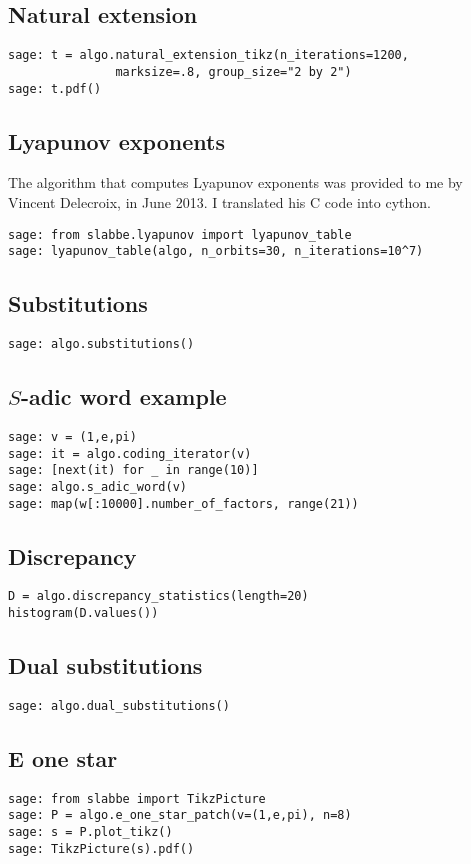 \subsection{Natural extension}
\begin{verbatim}
sage: t = algo.natural_extension_tikz(n_iterations=1200, 
               marksize=.8, group_size="2 by 2")
sage: t.pdf()
\end{verbatim}
\subsection{Lyapunov exponents}
The algorithm that computes Lyapunov exponents was provided to me
by Vincent Delecroix, in June 2013. I translated his C code into cython.
\begin{verbatim}
sage: from slabbe.lyapunov import lyapunov_table
sage: lyapunov_table(algo, n_orbits=30, n_iterations=10^7)
\end{verbatim}
\subsection{Substitutions}
\begin{verbatim}
sage: algo.substitutions()
\end{verbatim}
\subsection{$S$-adic word example}
\begin{verbatim}
sage: v = (1,e,pi)
sage: it = algo.coding_iterator(v)
sage: [next(it) for _ in range(10)]
sage: algo.s_adic_word(v)
sage: map(w[:10000].number_of_factors, range(21))  
\end{verbatim}
\subsection{Discrepancy}
\begin{verbatim}
D = algo.discrepancy_statistics(length=20)
histogram(D.values())
\end{verbatim}
\subsection{Dual substitutions}
\begin{verbatim}
sage: algo.dual_substitutions()
\end{verbatim}
\subsection{E one star}
\begin{verbatim}
sage: from slabbe import TikzPicture
sage: P = algo.e_one_star_patch(v=(1,e,pi), n=8)
sage: s = P.plot_tikz()
sage: TikzPicture(s).pdf()
\end{verbatim}
